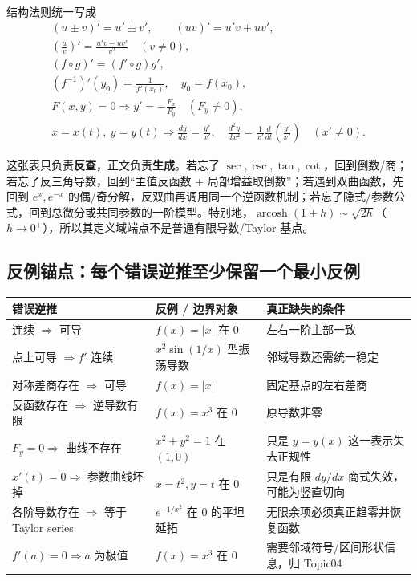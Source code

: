 \documentclass[11pt,a4paper]{ctexart}
\begin{document}
结构法则统一写成
\[
\begin{gathered}
(u\pm v)'=u'\pm v',\qquad
(uv)'=u'v+uv',\\
\left(\frac uv\right)'=\frac{u'v-uv'}{v^2}\quad(v\ne0),\\
(f\circ g)'=(f'\circ g)g',\\
(f^{-1})'(y_0)=\frac1{f'(x_0)},\quad y_0=f(x_0),\\
F(x,y)=0\Longrightarrow y'=-\frac{F_x}{F_y}\quad(F_y\ne0),\\
x=x(t),\ y=y(t)\Longrightarrow
\frac{dy}{dx}=\frac{y'}{x'},\quad
\frac{d^2y}{dx^2}=\frac1{x'}\frac d{dt}\left(\frac{y'}{x'}\right)
\quad(x'\ne0).
\end{gathered}
\]

这张表只负责\textbf{反查}，正文负责\textbf{生成}。若忘了 $\sec,\csc,\tan,\cot$，回到倒数/商；若忘了反三角导数，回到“主值反函数 + 局部增益取倒数”；若遇到双曲函数，先回到 $e^x,e^{-x}$ 的偶/奇分解，反双曲再调用同一个逆函数机制；若忘了隐式/参数公式，回到总微分或共同参数的一阶模型。特别地，$\operatorname{arcosh}(1+h)\sim\sqrt{2h}$（$h\to0^+$），所以其定义域端点不是普通有限导数/Taylor 基点。

\subsection{反例锚点：每个错误逆推至少保留一个最小反例}

\begin{center}
\begin{tabularx}{\linewidth}{L{4.0cm}L{4.0cm}Y}
\toprule
\textbf{错误逆推} & \textbf{反例 / 边界对象} & \textbf{真正缺失的条件}\\
\midrule
连续 $\Rightarrow$ 可导 & $f(x)=\lvert x\rvert$ 在 $0$ & 左右一阶主部一致\\
点上可导 $\Rightarrow f'$ 连续 & $x^2\sin(1/x)$ 型振荡导数 & 邻域导数还需统一稳定\\
对称差商存在 $\Rightarrow$ 可导 & $f(x)=\lvert x\rvert$ & 固定基点的左右差商\\
反函数存在 $\Rightarrow$ 逆导数有限 & $f(x)=x^3$ 在 $0$ & 原导数非零\\
$F_y=0\Rightarrow$ 曲线不存在 & $x^2+y^2=1$ 在 $(1,0)$ & 只是 $y=y(x)$ 这一表示失去正规性\\
$x'(t)=0\Rightarrow$ 参数曲线坏掉 & $x=t^2,y=t$ 在 $0$ & 只是有限 $dy/dx$ 商式失效，可能为竖直切向\\
各阶导数存在 $\Rightarrow$ 等于 Taylor series & $e^{-1/x^2}$ 在 $0$ 的平坦延拓 & 无限余项必须真正趋零并恢复函数\\
$f'(a)=0\Rightarrow a$ 为极值 & $f(x)=x^3$ 在 $0$ & 需要邻域符号/区间形状信息，归 Topic04\\
\bottomrule
\end{tabularx}
\end{center}
\end{document}
